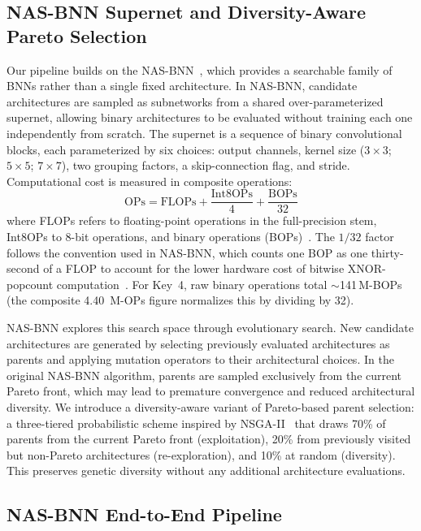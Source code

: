 \documentclass[conference]{IEEEtran}
\begin{document}
\subsection{NAS-BNN Supernet and Diversity-Aware Pareto Selection}

Our pipeline builds on the NAS-BNN~\cite{lin2025nasbnn}, which provides a searchable family of BNNs rather than a single fixed architecture. In NAS-BNN, candidate architectures are sampled as subnetworks from a shared over-parameterized supernet, allowing binary architectures to be evaluated without training each one independently from scratch.
The supernet is a sequence of binary convolutional blocks, each parameterized by six choices: output channels, kernel size ($3\times3$; $5\times5$; $7\times7$), two grouping factors, a skip-connection flag, and stride.
Computational cost is measured in composite operations:
\begin{equation}
\text{OPs} = \text{FLOPs} + \frac{\text{Int8OPs}}{4} + \frac{\text{BOPs}}{32}
\label{eq:ops}
\end{equation}
where FLOPs refers to floating-point operations in the full-precision stem, Int8OPs to 8-bit operations, and binary operations (BOPs)~\cite{lin2025nasbnn}.
The $1/32$ factor follows the convention used in NAS-BNN, which counts one BOP as one thirty-second of a FLOP to account for the lower hardware cost of bitwise XNOR-popcount computation~\cite{sze2017efficient}.
For Key~4, raw binary operations total $\sim$141\,M-BOPs (the composite 4.40~M-OPs figure normalizes this by dividing by 32).

NAS-BNN explores this search space through evolutionary search.
New candidate architectures are generated by selecting previously evaluated architectures as parents and applying mutation operators to their architectural choices.
In the original NAS-BNN algorithm, parents are sampled exclusively from the current Pareto front, which may lead to premature convergence and reduced architectural diversity.
We introduce a diversity-aware variant of Pareto-based parent selection: a three-tiered probabilistic scheme inspired by NSGA-II~\cite{deb2002nsga2} that draws 70\% of parents from the current Pareto front (exploitation), 20\% from previously visited but non-Pareto architectures (re-exploration), and 10\% at random (diversity).
This preserves genetic diversity without any additional architecture evaluations.

\subsection{NAS-BNN End-to-End Pipeline}
\end{document}
